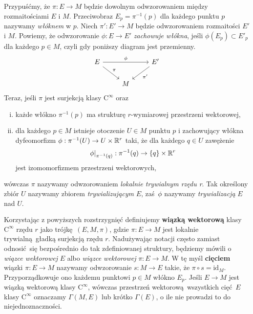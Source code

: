 Przypuśćmy, że \(\pi: E\to M\) będzie dowolnym odwzorowaniem między rozmaitościami \(E\) i \(M\). Przeciwobraz \(E_p = \pi^{-1}(p)\) dla każdego punktu \(p\) nazywamy \emph{włóknem} w \(p\). Niech \(\pi': E'\to M\) będzie odwzorowaniem rozmaitości \(E'\) i \(M\). Powiemy, że odwzorowanie \(\phi:E\to E'\) \emph{zachowuje włókna}, jeśli \(\phi(E_p)\subset E'_p\) dla każdego \(p\in M\), czyli gdy poniższy diagram jest przemienny.
\begin{equation*}
    \begin{tikzcd}
        E \arrow{dr}{\pi} \arrow{rr}{\phi} && E' \arrow{dl}{\pi'}\\
         & M 
    \end{tikzcd}
\end{equation*}
Teraz, jeśli \(\pi\) jest surjekcją klasy \(\mathrm{C}^\infty\) oraz
\begin{enumerate}[i)]
    \item każde włókno \(\pi^{-1}(p)\) ma strukturę \(r\)-wymiarowej przestrzeni wektorowej,
    \item dla każdego \(p\in M\) istnieje otoczenie \(U\in M\) punktu \(p\) i zachowujący włókna dyfeomorfizm \(\phi: \pi^{-1}(U)\to U\times \mathbb{R}^r\) taki, że dla każdego \(q\in U\) zawężenie
\begin{equation*}
\left.\phi\right|_{\pi^{-1}(q)}:\pi^{-1}(q)\to \{q\} \times \mathbb{R}^r
\end{equation*}
jest izomomorfizmem przestrzeni wektorowych,

\end{enumerate}
wówczas \(\pi\) nazywamy odwzorowaniem \emph{lokalnie trywialnym rzędu r}.  Tak określony zbiór \(U\) nazywamy zbiorem \emph{trywializującym} \(E\), zaś \(\phi\) nazywamy \emph{trywializacją} \(E\) nad \(U\).

Korzystając z powyższych rozstrzygnięć definiujemy \textbf{wiązką wektorową} klasy \(\mathrm{C}^\infty\) rzędu \(r\) jako trójkę \((E, M, \pi)\), gdzie \(\pi: E\to M\) jest lokalnie trywialną gładką surjekcją rzędu \(r\). Nadużywając notacji często zamiast odnosić się bezpośrednio do tak zdefiniowanej struktury, będziemy mówili o \emph{wiązce wektorowej} \(E\) albo \emph{wiązce wektorowej} \(\pi:E\to M\). W tę myśl \textbf{cięciem} wiązki \(\pi: E\to M\) nazywamy odwzorowanie \(s:M\to E\) takie, że \(\pi\circ s= \mathrm{id}_M\). Przyporządkowuje ono każdemu punktowi \(p\in M\) włókno \(E_p\). Jeśli \(E\to M\) jest wiązką wektorową klasy \(\mathrm{C}^\infty\), wówczas przestrzeń wektorową wszystkich cięć \(E\) klasy \(\mathrm{C}^\infty\) oznaczamy \(\Gamma(M, E)\) lub krótko \(\Gamma(E)\), o ile nie prowadzi to do niejednoznaczności. 

